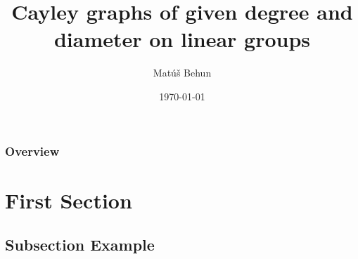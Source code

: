 \documentclass{beamer}
\title[]{Cayley graphs of given degree and diameter on linear groups} %
\author{Mat\'u\v{s} Behun} %
\institute[UCLA] %
{
Slovak University of Technology in Bratislava \\ %
\medskip
}
\date{\today} %
\begin{document}
\begin{frame}
\titlepage %
\end{frame}

\begin{frame}
\frametitle{Overview} %
\tableofcontents %
\end{frame}


\section{First Section} %

\subsection{Subsection Example} %
\end{document}
